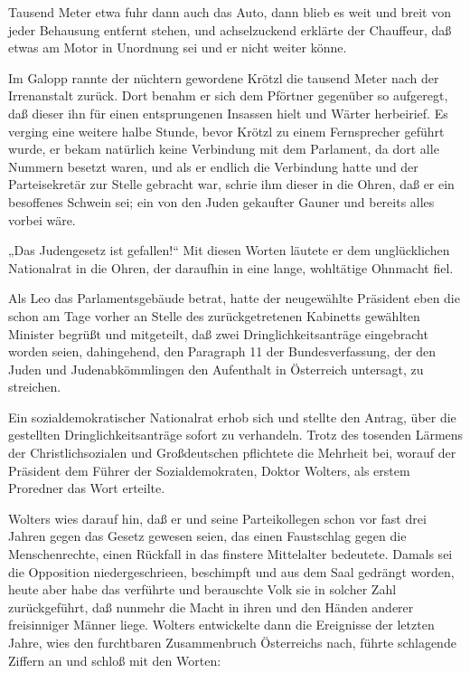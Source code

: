 Tausend Meter etwa fuhr dann auch das Auto, dann blieb es weit und
breit von jeder Behausung entfernt stehen, und achselzuckend
erklärte der Chauffeur, daß etwas am Motor in Unordnung sei und er
nicht weiter könne.

Im Galopp rannte der nüchtern gewordene Krötzl die tausend Meter
nach der Irrenanstalt zurück. Dort benahm  er sich
dem Pförtner gegenüber so aufgeregt, daß dieser ihn für einen
entsprungenen Insassen hielt und Wärter herbeirief. Es verging eine
weitere halbe Stunde, bevor Krötzl zu einem Fernsprecher geführt
wurde, er bekam natürlich keine Verbindung mit dem Parlament, da
dort alle Nummern besetzt waren, und als er endlich die Verbindung
hatte und der Parteisekretär zur Stelle gebracht war, schrie ihm
dieser in die Ohren, daß er ein besoffenes Schwein sei; ein von den
Juden gekaufter Gauner und bereits alles vorbei wäre.

„Das Judengesetz ist gefallen!“ Mit diesen Worten läutete er dem
unglücklichen Nationalrat in die Ohren, der daraufhin in eine
lange, wohltätige Ohnmacht fiel.

\tb{* * *}
Als Leo das Parlamentsgebäude betrat, hatte der neugewählte
Präsident eben die schon am Tage vorher an Stelle des
zurückgetretenen Kabinetts gewählten Minister begrüßt und
mitgeteilt, daß zwei Dringlichkeitsanträge eingebracht worden
seien, dahingehend, den Paragraph 11 der Bundesverfassung, der den
Juden und Judenabkömmlingen den Aufenthalt in Österreich
untersagt, zu streichen.

Ein sozialdemokratischer Nationalrat erhob sich und stellte den
Antrag, über die gestellten Dringlichkeitsanträge sofort zu
verhandeln. Trotz des tosenden Lärmens der Christlichsozialen und
Großdeutschen pflichtete die Mehrheit bei, worauf der Präsident dem
Führer der Sozialdemokraten, Doktor Wolters, als erstem Proredner
das Wort erteilte.

Wolters wies darauf hin, daß er und seine
Parteikollegen schon vor fast drei Jahren gegen das Gesetz gewesen
seien, das einen Faustschlag gegen die Menschenrechte, einen
Rückfall in das finstere Mittelalter bedeutete. Damals sei die
Opposition niedergeschrieen, beschimpft und aus dem Saal gedrängt
worden, heute aber habe das verführte und berauschte Volk sie in
solcher Zahl zurückgeführt, daß nunmehr die Macht in ihren und den
Händen anderer freisinniger Männer liege. Wolters entwickelte dann
die Ereignisse der letzten Jahre, wies den furchtbaren
Zusammenbruch Österreichs nach, führte schlagende Ziffern an und
schloß mit den Worten:

